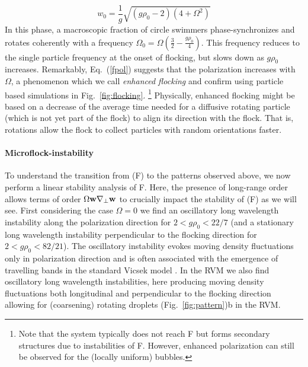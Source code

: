 \documentclass[aps,twocolumn,showlabels,showrefs,amsmath,amssymb,pre,superscriptaddress, floatfix, colors]{revtex4}
\newcommand{\1}{\begin{equation}}
\newcommand{\2}{\end{equation}}
\newcommand{\4}[2]{{\frac{#1}{#2}}}
\begin{document}
\1
w_0 = \4{1}{g}\sqrt{\left(g\rho_0 - 2\right) \left(4+\Omega^2 \right)} \label{fpol}
\2
In this phase, a macroscopic fraction of circle swimmers phase-synchronizes and rotates coherently with a frequency 
$\Omega_0 = \Omega \left(\4{3}{2}-\4{g \rho_0}{4}\right)$.
This frequency reduces to the single particle frequency at the onset of flocking, but slows
down as $g\rho_0$ increases.
Remarkably, Eq.~(\ref{fpol}) suggests that the polarization increases with $\Omega$, a phenomenon which we call \emph{enhanced flocking} and confirm using particle based simulations in Fig.~\ref{fig:flocking}.
\footnote{Note that the system typically does not reach F but forms secondary structures due to instabilities of F. 
However, enhanced polarization can still be observed for the (locally uniform) bubbles.}
Physically, enhanced flocking might be based on a decrease of the average time needed for a diffusive rotating particle (which is not yet part of the flock) to align its direction with the flock. 
That is, rotations allow the flock to collect particles with random orientations faster.  

\paragraph*{Microflock-instability}
To understand the transition from (F) to the patterns observed above, we now perform a linear stability analysis of F. 
Here, the presence of long-range order allows terms of order $\Omega {\bf w}\nabla_\perp {\bf w}$ to crucially impact the stability of (F) as we will see.
First considering the case $\Omega=0$ we find an oscillatory 
long wavelength instability along the polarization direction for $2<g \rho_0 < 22/7$ 
(and a stationary long wavelength instability perpendicular to the flocking direction for $2<g\rho_0<82/21$).
The oscillatory instability evokes moving density fluctuations only in polarization direction and is often associated with the 
emergence of travelling bands in the standard Vicsek model \cite{Bertin2009,Mishra2010}.
In the RVM we also find oscillatory long wavelength instabilities, here producing moving density fluctuations both longitudinal and perpendicular to the flocking direction
allowing for (coarsening) rotating droplets 
(Fig.~{\ref{fig:pattern}})b in the RVM. 
\end{document}
